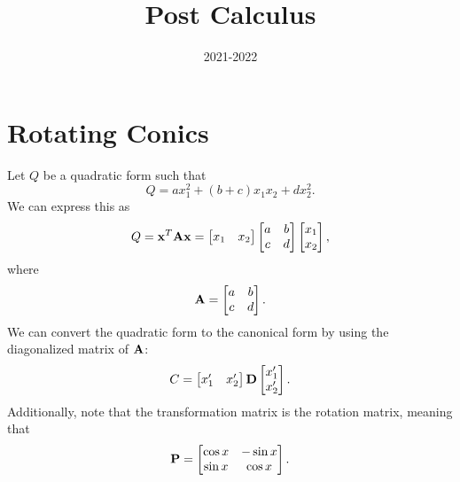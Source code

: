 \documentclass[11pt,twoside=semi,openright,numbers=noenddot]{scrbook}
\title{Post Calculus}
\date{2021-2022}
\begin{document}
\maketitle
{}
\tableofcontents
\newpage







\section{Rotating Conics}
Let $Q$ be a quadratic form such that $$Q = ax_{1}^2+(b+c)x_1x_2+dx_2^2.$$
We can express this as $$Q = \bold{x}^T \bold{A}\bold{x} = \begin{bmatrix} x_1 & x_2 \end{bmatrix} \begin{bmatrix} a & b \\ c & d \end{bmatrix}
\begin{bmatrix} x_1 \\ x_2 \end{bmatrix},$$ where $$\bold{A} = \begin{bmatrix} a & b \\ c & d \end{bmatrix}.$$
We can convert the quadratic form to the canonical form by using the diagonalized matrix of $\bold{A}$:
$$C = \begin{bmatrix} x_1' & x_2' \end{bmatrix} \bold{D}
\begin{bmatrix} x_1' \\ x_2' \end{bmatrix}.$$ Additionally, note that the transformation matrix is the
rotation matrix, meaning that
$$\bold{P} = \begin{bmatrix} \cos x & -\sin x \\ \sin x & \cos x\end{bmatrix}.$$
\end{document}
